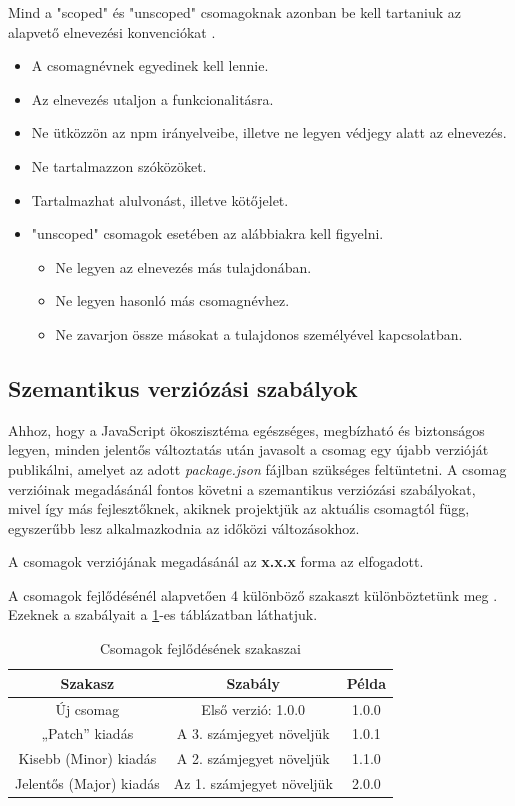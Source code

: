 	Mind a "scoped" és "unscoped" csomagoknak azonban be kell tartaniuk az alapvető elnevezési konvenciókat \cite{npm-naming}.
	
	\begin{itemize}
		\item A csomagnévnek egyedinek kell lennie.
		\item Az elnevezés utaljon a funkcionalitásra.
		\item Ne ütközzön az npm irányelveibe, illetve ne legyen védjegy alatt az elnevezés.
		\item Ne tartalmazzon szóközöket.
		\item Tartalmazhat alulvonást, illetve kötőjelet.
		\item "unscoped" csomagok esetében az alábbiakra kell figyelni.
		\begin{itemize}
			\item Ne legyen az elnevezés más tulajdonában.
			\item Ne legyen hasonló más csomagnévhez.
			\item Ne zavarjon össze másokat a tulajdonos személyével kapcsolatban.
		\end{itemize}
	\end{itemize}

	\subsection{Szemantikus verziózási szabályok}
	
	Ahhoz, hogy a JavaScript ökoszisztéma egészséges, megbízható és biztonságos legyen, minden jelentős változtatás után javasolt a csomag egy újabb verzióját publikálni, amelyet az adott \emph{package.json} fájlban szükséges feltüntetni. A csomag verzióinak megadásánál fontos követni a szemantikus verziózási szabályokat, mivel így más fejlesztőknek, akiknek projektjük az aktuális csomagtól függ, egyszerűbb lesz alkalmazkodnia az időközi változásokhoz.
	
	A csomagok verziójának megadásánál az \textbf{x.x.x} forma az elfogadott.
	
	A csomagok fejlődésénél alapvetően 4 különböző szakaszt különböztetünk meg \cite{npm-versioning}. Ezeknek a szabályait a \ref{tab:package-lifecycle}-es táblázatban láthatjuk.
	
	\begin{table}[h]
		\centering
		\caption{Csomagok fejlődésének szakaszai}
		\label{tab:package-lifecycle}
		\begin{tabular}{|c|c|c|}
			\hline
			\textbf{Szakasz} & \textbf{Szabály} & \textbf{Példa} \\
			\hline
			Új csomag & Első verzió: 1.0.0 & 1.0.0 \\
			\hline
			„Patch” kiadás & A 3. számjegyet növeljük & 1.0.1 \\
			\hline
			Kisebb (Minor) kiadás & A 2. számjegyet növeljük & 1.1.0 \\
			\hline
			Jelentős (Major) kiadás & Az 1. számjegyet növeljük & 2.0.0 \\
			\hline
		\end{tabular}
	\end{table}


